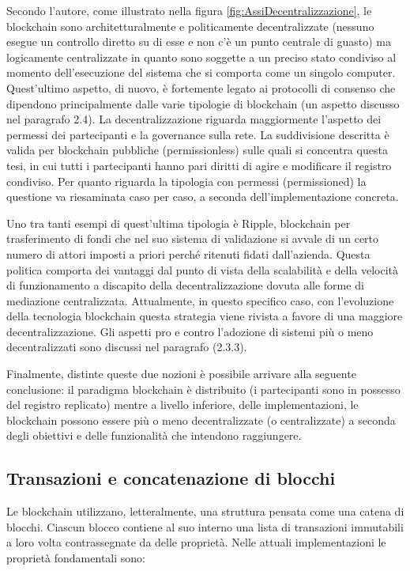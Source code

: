 Secondo l’autore, come illustrato nella figura \ref{fig:AssiDecentralizzazione}, le blockchain sono architetturalmente e politicamente decentralizzate (nessuno esegue un controllo diretto su di esse e non c’è un punto centrale di guasto) ma logicamente centralizzate in quanto sono soggette a un preciso stato condiviso al momento dell'esecuzione del sistema che si comporta come un singolo computer. Quest’ultimo aspetto, di nuovo, è fortemente legato ai protocolli di consenso che dipendono principalmente dalle varie tipologie di blockchain (un aspetto discusso nel paragrafo 2.4). La decentralizzazione riguarda maggiormente l’aspetto dei permessi dei partecipanti e la governance sulla rete. La suddivisione descritta è valida per blockchain pubbliche (permissionless) sulle quali si concentra questa tesi, in cui tutti i partecipanti hanno pari diritti di agire e modificare il registro condiviso. Per quanto riguarda la tipologia con permessi (permissioned) la questione va riesaminata caso per caso, a seconda dell’implementazione concreta. 

Uno tra tanti esempi di quest’ultima tipologia è Ripple, blockchain per trasferimento di fondi che nel suo sistema di validazione si avvale di un certo numero di attori imposti a priori perché ritenuti fidati dall'azienda. Questa politica comporta dei vantaggi dal punto di vista della scalabilità e della velocità di funzionamento a discapito della decentralizzazione dovuta alle forme di mediazione centralizzata. Attualmente, in questo specifico caso, con l’evoluzione della tecnologia blockchain questa strategia viene rivista a favore di una maggiore decentralizzazione. Gli aspetti pro e contro l’adozione di sistemi più o meno decentralizzati sono discussi nel paragrafo (2.3.3).

Finalmente, distinte queste due nozioni è possibile arrivare alla seguente conclusione: il paradigma blockchain è distribuito (i partecipanti sono in possesso del registro replicato) mentre a livello inferiore, delle implementazioni, le blockchain possono essere più o meno decentralizzate (o centralizzate) a seconda degli obiettivi e delle funzionalità che intendono raggiungere.

\subsection{Transazioni e concatenazione di blocchi}

Le blockchain utilizzano, letteralmente, una struttura pensata come una catena di blocchi. Ciascun blocco contiene al suo interno una lista di transazioni immutabili a loro volta contrassegnate da delle proprietà. Nelle attuali implementazioni le proprietà fondamentali sono:

